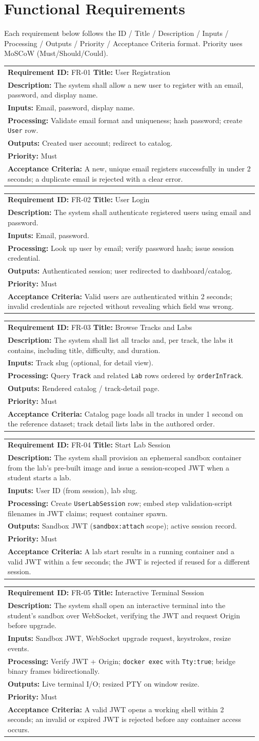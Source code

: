 \documentclass[11pt]{article}
\makeatletter
\newcommand{\frcard}[8]{%
  \par\noindent
  \begin{tabular}{@{}p{0.97\linewidth}@{}}
  \small
  \textbf{Requirement ID:} #1 \quad\textbf{Title:} #2\\[2pt]
  \textbf{Description:} #3\\[2pt]
  \textbf{Inputs:} #4\\[2pt]
  \textbf{Processing:} #5\\[2pt]
  \textbf{Outputs:} #6\\[2pt]
  \textbf{Priority:} #7\\[2pt]
  \textbf{Acceptance Criteria:} #8
  \end{tabular}
  \par\vspace{4mm}
}
\makeatother
\begin{document}
\section{Functional Requirements}
Each requirement below follows the ID / Title / Description / Inputs
/ Processing / Outputs / Priority / Acceptance Criteria format.
Priority uses MoSCoW (Must/Should/Could).

\frcard{FR-01}{User Registration}
 {The system shall allow a new user to register with an email,
 password, and display name.}
 {Email, password, display name.}
 {Validate email format and uniqueness; hash password; create
 \texttt{User} row.}
 {Created user account; redirect to catalog.}
 {Must}
 {A new, unique email registers successfully in under 2 seconds; a
 duplicate email is rejected with a clear error.}

\frcard{FR-02}{User Login}
 {The system shall authenticate registered users using email and
 password.}
 {Email, password.}
 {Look up user by email; verify password hash; issue session
 credential.}
 {Authenticated session; user redirected to dashboard/catalog.}
 {Must}
 {Valid users are authenticated within 2 seconds; invalid credentials
 are rejected without revealing which field was wrong.}

\frcard{FR-03}{Browse Tracks and Labs}
 {The system shall list all tracks and, per track, the labs it
 contains, including title, difficulty, and duration.}
 {Track slug (optional, for detail view).}
 {Query \texttt{Track} and related \texttt{Lab} rows ordered by
 \texttt{orderInTrack}.}
 {Rendered catalog / track-detail page.}
 {Must}
 {Catalog page loads all tracks in under 1 second on the reference
 dataset; track detail lists labs in the authored order.}

\frcard{FR-04}{Start Lab Session}
 {The system shall provision an ephemeral sandbox container from the
 lab's pre-built image and issue a session-scoped JWT when a student
 starts a lab.}
 {User ID (from session), lab slug.}
 {Create \texttt{UserLabSession} row; embed step validation-script
 filenames in JWT claims; request container spawn.}
 {Sandbox JWT (\texttt{sandbox:attach} scope); active session record.}
 {Must}
 {A lab start results in a running container and a valid JWT within a
 few seconds; the JWT is rejected if reused for a different session.}

\frcard{FR-05}{Interactive Terminal Session}
 {The system shall open an interactive terminal into the student's
 sandbox over WebSocket, verifying the JWT and request Origin before
 upgrade.}
 {Sandbox JWT, WebSocket upgrade request, keystrokes, resize events.}
 {Verify JWT + Origin; \texttt{docker exec} with \texttt{Tty:true};
 bridge binary frames bidirectionally.}
 {Live terminal I/O; resized PTY on window resize.}
 {Must}
 {A valid JWT opens a working shell within 2 seconds; an invalid or
 expired JWT is rejected before any container access occurs.}
\end{document}
